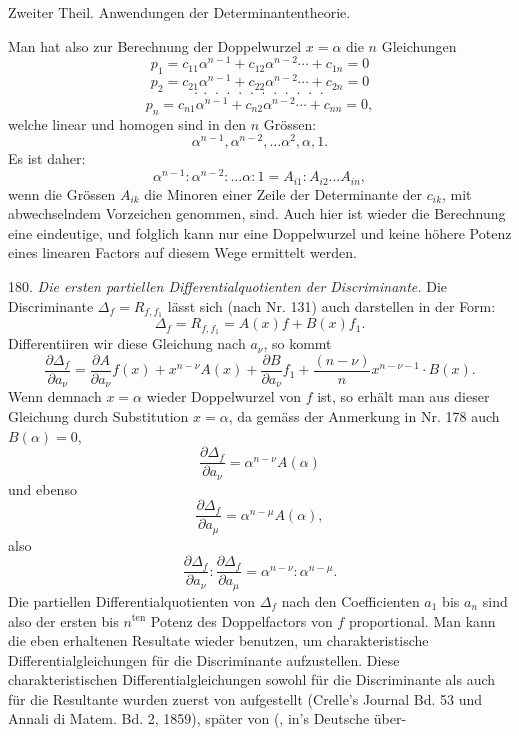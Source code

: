 \documentclass[11pt]{article}
\providecommand{\gesperrt}[1]{\textls[130]{#1}}
\providecommand{\weberpage}[1]{}
\providecommand{\weq}[2]{\begin{equation}\tag{#1}#2\end{equation}}
\let\Delta\varDelta
\begin{document}
\weberpage{192}
Zweiter Theil. Anwendungen der Determinantentheorie.

Man hat also zur Berechnung der Doppelwurzel $x=\alpha$ die
$n$ Gleichungen
\[
p_1 = c_{11}\alpha^{n-1} + c_{12}\alpha^{n-2} \cdots + c_{1n} = 0
\]
\[
p_2 = c_{21}\alpha^{n-1} + c_{22}\alpha^{n-2} \cdots + c_{2n} = 0
\]
\[
\cdot\ \cdot\ \cdot\ \cdot\ \cdot\ \cdot\ \cdot\ \cdot\ \cdot\ \cdot\ \cdot\ \cdot
\]
\[
p_n = c_{n1}\alpha^{n-1} + c_{n2}\alpha^{n-2} \cdots + c_{nn} = 0,
\]
welche linear und homogen sind in den $n$ Grössen:
\[
\alpha^{n-1}, \alpha^{n-2}, \ldots \alpha^2, \alpha, 1.
\]
Es ist daher:
\[
\alpha^{n-1} : \alpha^{n-2} : \ldots \alpha : 1 = A_{i1} : A_{i2} \ldots A_{in},
\]
wenn die Grössen $A_{ik}$ die Minoren einer Zeile der Determinante der
$c_{ik}$, mit abwechselndem Vorzeichen genommen, sind. Auch hier ist
wieder die Berechnung eine eindeutige, und folglich kann nur eine
Doppelwurzel und keine höhere Potenz eines linearen Factors auf
diesem Wege ermittelt werden.

180. \textit{Die ersten partiellen Differentialquotienten der Discriminante.}
Die Discriminante $\Delta_f = R_{f,f_1}$ lässt sich (nach Nr. 131) auch darstellen
in der Form:
\weq{I}{\Delta_f = R_{f,f_1} = A(x)f + B(x)f_1.}
Differentiiren wir diese Gleichung nach $a_\nu$, so kommt
\[
\frac{\partial \Delta_f}{\partial a_\nu} = \frac{\partial A}{\partial a_\nu} f(x) + x^{n-\nu} A(x) + \frac{\partial B}{\partial a_\nu} f_1 + \frac{(n-\nu)}{n} x^{n-\nu-1} \cdot B(x).
\]
Wenn demnach $x=\alpha$ wieder Doppelwurzel von $f$ ist, so erhält man
aus dieser Gleichung durch Substitution $x=\alpha$, da gemäss der Anmerkung in Nr. 178 auch $B(\alpha)=0$,
\[
\frac{\partial \Delta_f}{\partial a_\nu} = \alpha^{n-\nu} A(\alpha)
\]
und ebenso
\[
\frac{\partial \Delta_f}{\partial a_\mu} = \alpha^{n-\mu} A(\alpha),
\]
also
\[
\frac{\partial \Delta_f}{\partial a_\nu} : \frac{\partial \Delta_f}{\partial a_\mu} = \alpha^{n-\nu} : \alpha^{n-\mu}.
\]
Die partiellen Differentialquotienten von $\Delta_f$ nach den Coefficienten
$a_1$ bis $a_n$ sind also der ersten bis $n^{\text{ten}}$ Potenz des Doppelfactors von $f$
proportional. Man kann die eben erhaltenen Resultate wieder benutzen, um charakteristische Differentialgleichungen für die Discriminante
aufzustellen. Diese charakteristischen Differentialgleichungen sowohl
für die Discriminante als auch für die Resultante wurden zuerst von
\gesperrt{Brioschi} aufgestellt (Crelle's Journal Bd. 53 und Annali di Matem.
Bd. 2, 1859), später von \gesperrt{Noether} (\gesperrt{Faà di Bruno}, in's Deutsche über-
\end{document}
